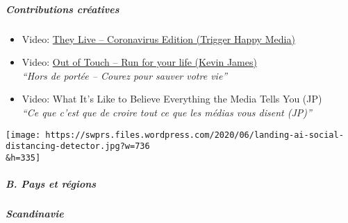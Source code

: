 \hypertarget{contributions-cruxe9atives}{%
\subparagraph{\texorpdfstring{\textbf{Contributions
créatives}}{Contributions créatives}}\label{contributions-cruxe9atives}}

\begin{itemize}
\tightlist
\item
  Video: \href{https://www.youtube.com/watch?v=xikn9JNu4Ag}{They Live --
  Coronavirus Edition (Trigger Happy Media)}
\item
  Video: \href{https://www.youtube.com/watch?v=wfGAktuU93s}{Out of Touch
  -- Run for your life (Kevin James)}\\
  \emph{``Hors de portée -- Courez pour sauver votre vie''}
\item
  Video: What It's Like to Believe Everything the Media Tells You (JP)\\
  \emph{``Ce que c'est que de croire tout ce que les médias vous disent
  (JP)''}
\end{itemize}

\texttt{[image: https://swprs.files.wordpress.com/2020/06/landing-ai-social-distancing-detector.jpg?w=736\\\&h=335]}

\hypertarget{b-pays-et-ruxe9gions}{%
\subparagraph{\texorpdfstring{\textbf{B. Pays et
régions}}{B. Pays et régions}}\label{b-pays-et-ruxe9gions}}

\hypertarget{scandinavie}{%
\subparagraph{\texorpdfstring{\textbf{Scandinavie}}{Scandinavie}}\label{scandinavie}}

